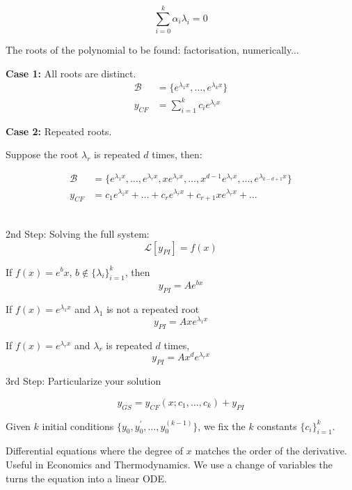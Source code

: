 \documentclass[twoside]{scrartcl}
\begin{document}
\[\sum_{i=0}^k \alpha_i \lambda_i = 0\]

The roots of the polynomial to be found: factorisation, numerically...

\textbf{Case 1:} All roots are distinct. 
\[
\begin{aligned}
  \mathcal{B} &= \{e^{\lambda_1x},\dots,e^{\lambda_kx}\}\\
  y_{CF} &= \sum_{i=1}^k c_ie^{\lambda_ix}
\end{aligned}
\]

\textbf{Case 2:} Repeated roots. 

Suppose the root $\lambda_r$ is repeated $d$ times, then: 

\[
\begin{aligned}
  \mathcal{B} &= \{e^{\lambda_1x},\dots,e^{\lambda_rx},xe^{\lambda_rx},\dots,x^{d-1}e^{\lambda_rx},\dots,e^{\lambda_{k-d+1}x}\}\\
  y_{CF} &= c_1e^{\lambda_1x} + \dots + c_re^{\lambda_rx} + c_{r+1}xe^{\lambda_rx} + \dots 
\end{aligned}
\]~

2nd Step: Solving the full system:
\[\mathcal{L}[y_{PI}] = f(x)\]

If $f(x) = e^bx$, $b \not\in \{\lambda_i\}_{i=1}^k$, then
\[y_{PI} = Ae^{bx}\]

If $f(x) = e^{\lambda_1x}$ and $\lambda_1$ is not a repeated root
\[y_{PI} = Axe^{\lambda_1x}\]

If $f(x) = e^{\lambda_rx}$ and $\lambda_r$ is repeated $d$ times, 
\[y_{PI} = Ax^de^{\lambda_rx} \]

3rd Step: Particularize your solution

\[y_{GS} = y_{CF}(x;c_1,\dots,c_k) + y_{PI}\]

Given $k$ initial conditions $\{y_0,y_0^{'},\dots,y_0^{(k-1)}\}$, we fix the $k$ constants $\{c_i\}_{i=1}^k$. 






Differential equations where the degree of $x$ matches the order of the derivative. Useful in Economics and Thermodynamics. We use a change of variables the turns the equation into a linear ODE.\\
\end{document}
